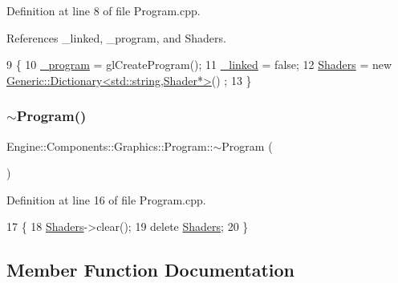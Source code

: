 Definition at line 8 of file Program.\+cpp.



References \+\_\+linked, \+\_\+program, and Shaders.


\begin{DoxyCode}
9 \{
10     \mbox{\hyperlink{classEngine_1_1Components_1_1Graphics_1_1Program_a23fb9432b8cd14e9cfa27e23f483712d}{\_program}} = glCreateProgram();
11     \mbox{\hyperlink{classEngine_1_1Components_1_1Graphics_1_1Program_abd46071ffae3fccf2730393cecad9646}{\_linked}} = \textcolor{keyword}{false};
12     \mbox{\hyperlink{classEngine_1_1Components_1_1Graphics_1_1Program_aff39fa56fc1fab1bce6c8a5ce29ae161}{Shaders}} = \textcolor{keyword}{new} \mbox{\hyperlink{classGeneric_1_1Dictionary}{Generic::Dictionary<std::string,Shader*>}}()
      ;
13 \}
\end{DoxyCode}
\mbox{\label{classEngine_1_1Components_1_1Graphics_1_1Program_ac7c50fa362e7d460d652dac07175e750}} 
\subsubsection{\texorpdfstring{$\sim$\+Program()}{~Program()}}
{\footnotesize\ttfamily Engine\+::\+Components\+::\+Graphics\+::\+Program\+::$\sim$\+Program (\begin{DoxyParamCaption}{ }\end{DoxyParamCaption})}



Definition at line 16 of file Program.\+cpp.


\begin{DoxyCode}
17 \{
18     \mbox{\hyperlink{classEngine_1_1Components_1_1Graphics_1_1Program_aff39fa56fc1fab1bce6c8a5ce29ae161}{Shaders}}->clear();
19     \textcolor{keyword}{delete} \mbox{\hyperlink{classEngine_1_1Components_1_1Graphics_1_1Program_aff39fa56fc1fab1bce6c8a5ce29ae161}{Shaders}};
20 \}
\end{DoxyCode}


\subsection{Member Function Documentation}
\mbox{\label{classEngine_1_1Components_1_1Graphics_1_1Program_a95af201a6fab77be50b5fdefbf3bbe63}} 
